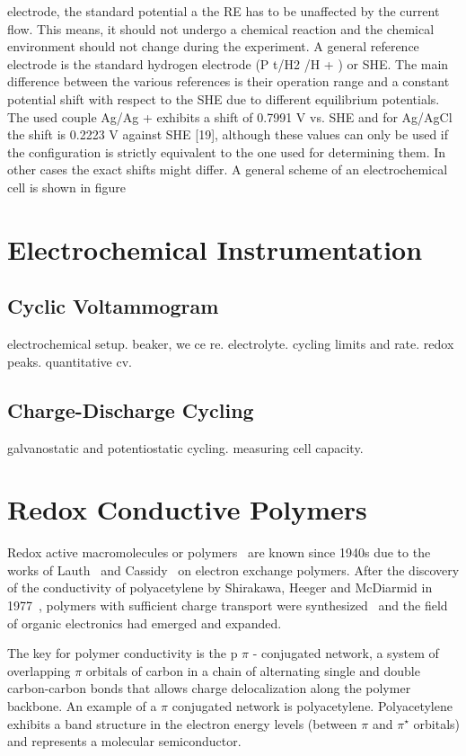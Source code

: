 electrode, the standard potential a the RE has to be unaffected by the current flow.
This means, it should not undergo a chemical reaction and the chemical environment
should not change during the experiment. A general reference electrode is the standard
hydrogen electrode (P t/H2 /H + ) or SHE. The main difference between the various
references is their operation range and a constant potential shift with respect to the
SHE due to different equilibrium potentials. The used couple Ag/Ag + exhibits a shift
of 0.7991 V vs. SHE and for Ag/AgCl the shift is 0.2223 V against SHE [19], although
these values can only be used if the configuration is strictly equivalent to the one used
for determining them. In other cases the exact shifts might differ. A general scheme
of an electrochemical cell is shown in figure



\section{Electrochemical Instrumentation}
\subsection{Cyclic Voltammogram}
electrochemical setup. beaker, we ce re. electrolyte. cycling limits and rate. redox peaks. quantitative cv.
\subsection{Charge-Discharge Cycling}
\label{sec:echem_charging}
galvanostatic and potentiostatic cycling. measuring cell capacity.

\section{Redox Conductive Polymers}

Redox active macromolecules or polymers~\cite{Staudinger_1920} are known since 1940s due to the works of Lauth~\cite{Lauth_1944} and Cassidy~\cite{Cassidy_1949} on electron exchange polymers. After the discovery of the conductivity of polyacetylene by Shirakawa, Heeger and McDiarmid in 1977~\cite{Shirakawa_1977}, polymers with sufficient charge transport were synthesized~\cite{} and the field of organic electronics had emerged and expanded. 

\par

The key for polymer conductivity is the p $\pi$ - conjugated network, a system of overlapping $\pi$ orbitals of carbon in a chain of alternating single and double carbon-carbon bonds that allows charge delocalization along the polymer backbone. An example of a $\pi$ conjugated network is polyacetylene. Polyacetylene exhibits a band structure in the electron energy levels (between $\pi$ and $\pi^\star$ orbitals) and represents a molecular semiconductor.

